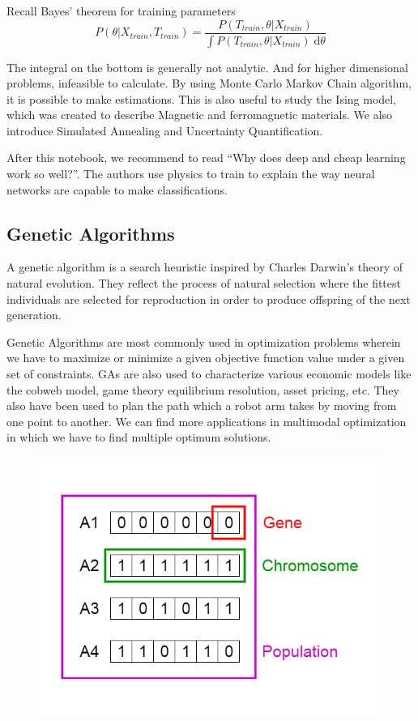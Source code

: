 \documentclass[11pt,letterpaper]{report}
\begin{document}
Recall Bayes' theorem for training parameters
\begin{equation}
P(\theta|X_{train}, T_{train}) = \frac{P(T_{train}, \theta|X_{train})}{\int P(T_{train}, \theta|X_{train})\;\mathrm{d}\theta} 
\end{equation}

The integral on the bottom is generally not analytic. And for higher dimensional problems, infeasible to calculate. By using Monte Carlo Markov Chain algorithm, it is possible to make estimations.  This is also useful to study   the Ising model, which was created to describe Magnetic and ferromagnetic materials. We also introduce Simulated Annealing and Uncertainty Quantification.

After this notebook,  we recommend to read ``Why does deep and cheap learning work so well?''.  The authors use physics to train to explain the way neural networks are capable to make classifications. 
\subsection{Genetic Algorithms}
A genetic algorithm is a search heuristic  inspired by Charles Darwin’s theory of natural evolution. They reflect the process of natural selection where the fittest individuals are selected for reproduction in order to produce offspring of the next generation.



Genetic Algorithms are most commonly used in optimization problems wherein we have to maximize or minimize a given objective function value under a given set of constraints. GAs are also used to characterize various economic models like the cobweb model, game theory equilibrium resolution, asset pricing, etc. They also have been used to plan the path which a robot arm takes by moving from one point to another. We can find more applications in multimodal optimization in which we have to find multiple optimum solutions.



\begin{figure}[h!]
	\centering
	\includegraphics[width=0.45\linewidth]{figures/GAfigure1.png}
	\caption{}
	\label{fig:GA}
\end{figure} 	
\end{document}

